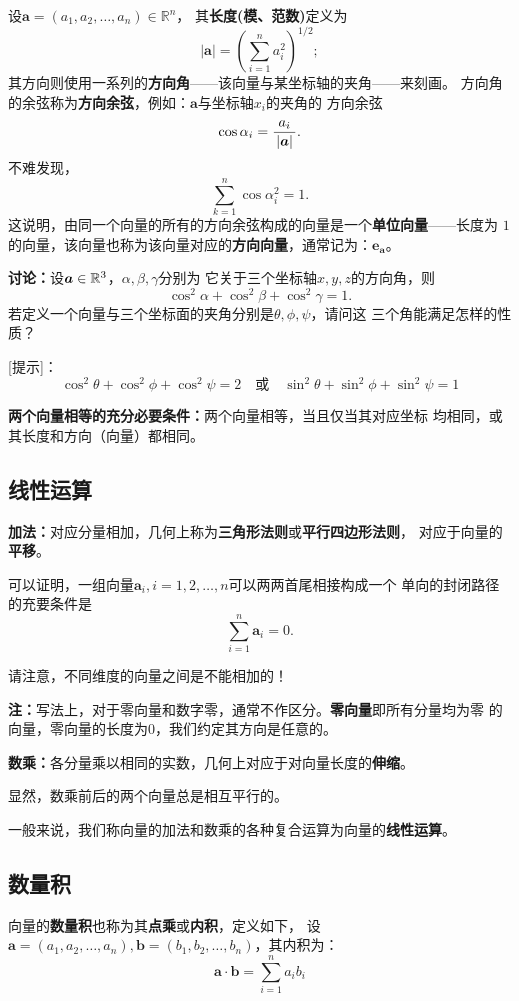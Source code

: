 设$\bm{a}=(a_1,a_2,\ldots,a_n)\in\mathbb{R}^n$，
其{\bf 长度(模、范数)}定义为
$$|\bm{a}|=\left(\sum\limits_{i=1}^na_i^2\right)^{1/2};$$
其方向则使用一系列的{\bf 方向角}——该向量与某坐标轴的夹角——来刻画。
方向角的余弦称为{\bf 方向余弦}，例如：$\bm{a}$与坐标轴$x_i$的夹角的
方向余弦
$$\cos\alpha_i=\displaystyle\frac{\,{a_i}\,}{\,{|\bm{a}|}\,}.$$
不难发现，
$$\sum\limits_{k=1}^n\cos\alpha_i^2=1.$$
这说明，由同一个向量的所有的方向余弦构成的向量是一个{\bf 单位向量}——长度为
$1$的向量，该向量也称为该向量对应的{\bf 方向向量}，通常记为：$\bm{e_a}$。

{\bf 讨论：}设$\bm{a}\in\mathbb{{R}}^3$，$\alpha,\beta,\gamma$分别为
它关于三个坐标轴$x,y,z$的方向角，则
$$\cos^2\alpha+\cos^2\beta+\cos^2\gamma=1.$$
若定义一个向量与三个坐标面的夹角分别是$\theta,\phi,\psi$，请问这
三个角能满足怎样的性质？

[提示]：
$$\cos^2\theta+\cos^2\phi+\cos^2\psi=2\quad\mbox{或}
\quad \sin^2\theta+\sin^2\phi+\sin^2\psi=1$$

\begin{thx}
	{\bf 两个向量相等的充分必要条件：}两个向量相等，当且仅当其对应坐标
	均相同，或其长度和方向（向量）都相同。
\end{thx}

\subsection{线性运算}

{\bf 加法：}对应分量相加，几何上称为{\bf 三角形法则}或{\bf 平行四边形法则}，
对应于向量的{\bf 平移}。

可以证明，一组向量$\bm{a}_i,i=1,2,\ldots,n$可以两两首尾相接构成一个
单向的封闭路径的充要条件是
$$\sum\limits_{i=1}^n\bm{a}_i=0.$$

请注意，不同维度的向量之间是不能相加的！

{\bf 注：}写法上，对于零向量和数字零，通常不作区分。{\bf 零向量}即所有分量均为零
的向量，零向量的长度为$0$，我们约定其方向是任意的。

{\bf 数乘：}各分量乘以相同的实数，几何上对应于对向量长度的{\bf 伸缩}。

显然，数乘前后的两个向量总是相互平行的。

一般来说，我们称向量的加法和数乘的各种复合运算为向量的{\bf 线性运算}。

\subsection{数量积}

向量的{\bf 数量积}也称为其{\bf 点乘}或{\bf 内积}，定义如下，
设$\bm{a}=(a_1,a_2,\ldots,a_n),\bm{b}=(b_1,b_2,\ldots,b_n)$，其内积为：
$$\bm{a}\cdot\bm{b}=\sum\limits_{i=1}^na_ib_i$$

